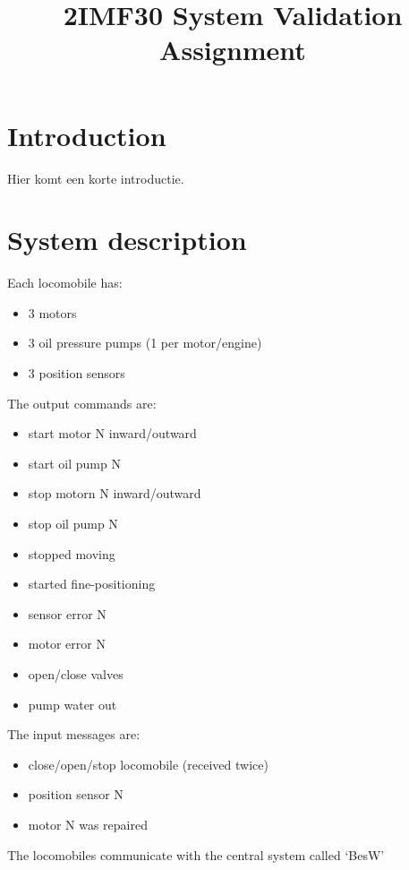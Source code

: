 \documentclass{article}
\title{2IMF30 System Validation Assignment}
\begin{document}
\section{Introduction}
Hier komt een korte introductie.

\section{System description}
Each locomobile has:
\begin{itemize}
    \item 3 motors
    \item 3 oil pressure pumps (1 per motor/engine)
    \item 3 position sensors
\end{itemize}
The output commands are:
\begin{itemize}
    \item start motor N inward/outward
    \item start oil pump N
    \item stop motorn N inward/outward
    \item stop oil pump N

    \item stopped moving
    \item started fine-positioning
    \item sensor error N
    \item motor error N

    \item open/close valves
    \item pump water out
\end{itemize}
The input messages are:
\begin{itemize}
    \item close/open/stop locomobile (received twice)
    \item position sensor N
    \item motor N was repaired
\end{itemize}

The locomobiles communicate with the central system called `BesW'
\end{document}
